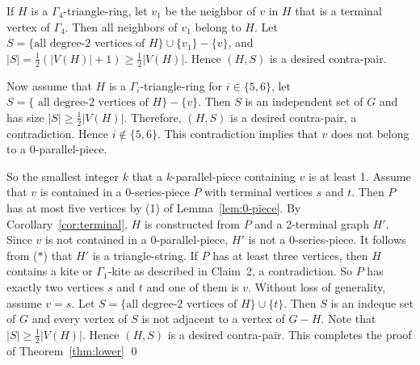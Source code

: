 \documentclass{article}
\begin{document}
If $H$ is a $\Gamma_4$-triangle-ring, let $v_1$ be the neighbor of $v$ in $H$ that is a terminal vertex of $\Gamma_4$. Then all neighbors of $v_1$ belong to $H$. Let $S=\{\mbox{all degree-2 vertices of } H\}\cup \{v_1\}-\{v\}$, and $|S|= \frac 1 2 (|V(H)|+1)\ge \frac 1 2 |V(H)|$. Hence $(H,S)$ is a desired contra-pair. 

Now assume that $H$ is a $\Gamma_i$-triangle-ring for $i\in \{5, 6 \}$,  let 
$S=  \{\mbox{ all degree-2 vertices of } H \}-\{v\} $. Then $S$ is an independent set of $G$ and has size $|S|\ge \frac 1 2 |V(H)|$. Therefore, $(H,S)$ is a desired contra-pair, a contradiction. Hence $i\notin \{5,6\}$.  This contradiction implies that $v$ does not belong to a $0$-parallel-piece.  \medskip

So the smallest integer $k$ that a $k$-parallel-piece containing $v$ is at least 1. Assume that $v$ is contained in a $0$-series-piece $P$ with terminal vertices $s$ and $t$. Then $P$ has at most five vertices by (1) of Lemma~\ref{lem:0-piece}. By Corollary~\ref{cor:terminal}, $H$ is constructed from $P$ and a 2-terminal graph $H'$. Since $v$ is not contained in a $0$-parallel-piece, $H'$ is not a $0$-series-piece. 
It follows from ($*$) that $H'$ is a triangle-string. If $P$ has at least three vertices, then $H$ contains a kite or $\Gamma_1$-kite as described in Claim~2, a contradiction. So $P$ has exactly two vertices $s$ and $t$ and one of them is $v$.  Without loss of generality, assume $v=s$. %
Let $S=\{\mbox{all degree-2 vertices of }H\}\cup \{t\}$. Then $S$ is an indeque set of $G$ and every vertex of $S$ is not adjacent to a vertex of $G-H$. Note that $|S|\ge \frac 1 2 |V(H)|$. Hence $(H, S)$ is a desired contra-pair. This completes the proof of Theorem~\ref{thm:lower}
\qed

\end{document}
